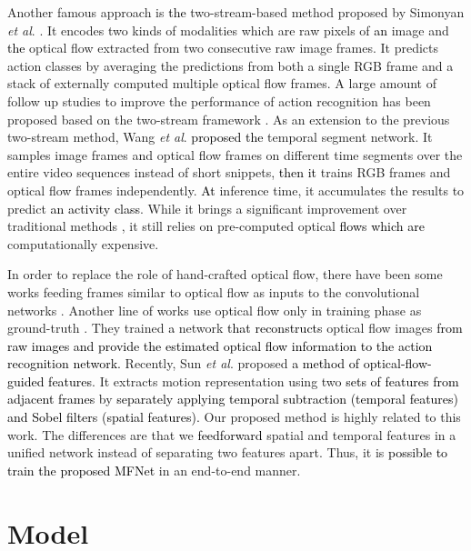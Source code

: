 \documentclass[runningheads]{llncs}
\newcommand{\etal}{\textit{et al}. }
\newcommand{\nj}[1]{\textcolor{black}{#1}}
\newcommand{\sj}[1]{\textcolor{black}{#1}}
\begin{document}
Another famous approach is \nj{the} two-stream-based method proposed by Simonyan \etal \cite{simonyan2014two}. It encodes two kinds of modalities which are raw pixels of \nj{an} image and \nj{the} optical flow extracted from two consecutive raw image frames. It predicts action classes by averaging the predictions from both a single RGB frame and a stack of externally computed multiple optical flow frames. A large amount of follow up studies\cite{miech2017learnable,wang2017appearance,wu2015fusing} to improve the performance of action recognition has been proposed based on the two-stream framework \cite{feichtenhofer2016convolutional,ng2015beyond,wang2016temporal}. 
As an extension to the previous two-stream method, Wang \etal \cite{wang2016temporal} \nj{proposed the} temporal segment network. It samples image frames and optical flow frames on different time segments over the entire video sequences instead of short snippets, \nj{then it} trains RGB frames and optical flow frames independently. \nj{At} inference time, it accumulates the results to predict \nj{an activity class}.
While it brings a significant improvement over traditional methods \cite{dalal2006human,wang2011action,wang2013action}, it still relies on pre-computed optical \nj{flows which are} computationally expensive. 

In order to replace the role of hand-crafted optical flow, there have been some works feeding frames similar to optical flow as inputs to the convolutional networks \cite{wang2016temporal,zhang2016real}. Another line of works use optical flow only in training phase as ground-truth \cite{ng2016actionflownet,zhu2017hidden}. They trained \nj{a} network \nj{that reconstructs} optical flow images \nj{from raw images and provide the estimated optical flow information to the action recognition network.} 
Recently, Sun \etal \cite{DBLP:journals/corr/abs-1711-11152} proposed \nj{a method of optical-flow-guided features}. It extracts motion representation using two \nj{sets of features from adjacent frames} by \nj{separately applying temporal subtraction (temporal features)  and Sobel filters (spatial features).} Our proposed method is highly related to this work. The differences are that we \sj{feedforward} spatial and temporal features in a unified network instead of separating two features apart. Thus, it is \nj{possible to train the proposed MFNet} in an end-to-end manner.

\section{Model}
\label{sec:model}
\end{document}
